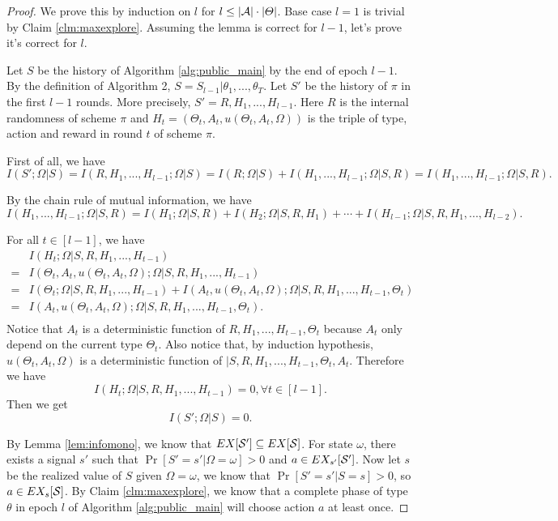 \begin{proof}
We prove this by induction on $l$ for $l \leq |\mathcal{A}|\cdot |\varTheta|$. Base case $l=1$ is trivial by Claim \ref{clm:maxexplore}. Assuming the lemma is correct for $l-1$, let's prove it's correct for $l$. 

Let $S$ be the history of Algorithm \ref{alg:public_main} by the end of epoch $l-1$. By the definition of Algorithm 2, $S = S_{l-1} | \theta_1,...,\theta_T$.  Let $S'$ be the history of $\pi$ in the first $l-1$ rounds. More precisely, $S' = R, H_1,...,H_{l-1}$. Here $R$ is the internal randomness of scheme $\pi$ and $H_t = (\Theta_t, A_t, u(\Theta_t, A_t, \Omega))$ is the triple of type, action and reward in round $t$ of scheme $\pi$. 

First of all, we have
\[
I(S'; \Omega| S) = I(R,H_1,...,H_{l-1}; \Omega| S)  = I(R; \Omega| S) + I(H_1,...,H_{l-1}; \Omega|S, R) = I(H_1,...,H_{l-1}; \Omega|S, R). 
\]

By the chain rule of mutual information, we have
\[
 I(H_1,...,H_{l-1}; \Omega|S, R) = I(H_1;\Omega|S,R) + I(H_2;\Omega|S, R ,H_1) + \cdots + I(H_{l-1}; \Omega|S,R,H_1,...,H_{l-2}). 
\]

For all $t \in [l-1]$, we have
\begin{align*}
&I(H_t; \Omega|S,R,H_1,...,H_{t-1}) \\
=& I(\Theta_t, A_t, u(\Theta_t, A_t, \Omega); \Omega|S,R,H_1,...,H_{t-1}) \\
=& I(\Theta_t ; \Omega|S,R,H_1,...,H_{t-1}) +  I(A_t, u(\Theta_t, A_t, \Omega); \Omega|S,R,H_1,...,H_{t-1},\Theta_t) \\
=& I(A_t, u(\Theta_t, A_t, \Omega); \Omega|S,R,H_1,...,H_{t-1},\Theta_t). \\
\end{align*}
Notice that $A_t$ is a deterministic function of $R,H_1,...,H_{t-1},\Theta_t$ because $A_t$ only depend on the current type $\Theta_t$. Also notice that, by induction hypothesis, $u(\Theta_t, A_t, \Omega)$ is a deterministic function of $|S,R,H_1,...,H_{t-1},\Theta_t, A_t$. Therefore we have
\[
I(H_t; \Omega|S,R,H_1,...,H_{t-1}) = 0, \forall t \in [l-1].
\]
Then we get 
\[
I(S'; \Omega | S) = 0.
\]

By Lemma \ref{lem:infomono}, we know that $EX[\mathcal{S}'] \subseteq EX[\mathcal{S}]$. For state $\omega$, there exists a signal $s'$ such that $\Pr[S'=s'|\Omega =\omega] >0 $ and $a \in EX_{s'} [\mathcal{S}']$. Now let $s$ be the realized value of $S$ given $\Omega = \omega$, we know that $\Pr[S'=s'|S=s] >0$, so $a \in EX_s[\mathcal{S}]$. By Claim \ref{clm:maxexplore}, we know that a complete phase of type $\theta$ in epoch $l$ of Algorithm \ref{alg:public_main} will choose action $a$ at least once. 


\end{proof}
